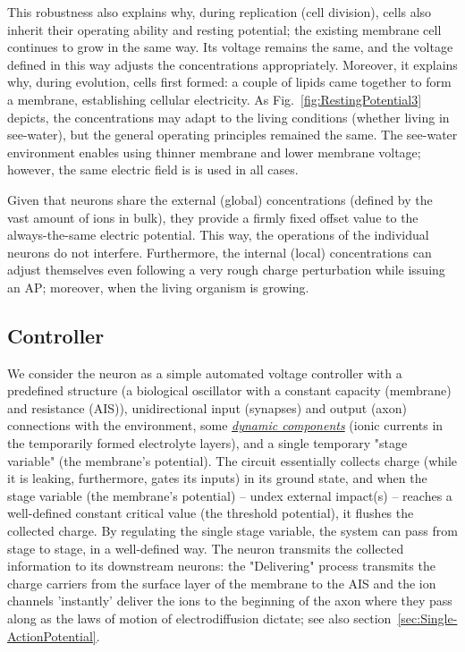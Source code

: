 This robustness also explains why, during replication (cell division), cells also inherit their operating ability and resting potential; the existing membrane cell continues to grow in the same way. Its voltage remains the same, and the voltage defined in this way adjusts the concentrations appropriately. Moreover, it explains why, during evolution, cells first formed: a couple of lipids came together to form a membrane, establishing cellular electricity. As Fig.~\ref{fig:RestingPotential3} depicts, the concentrations may adapt to the living conditions (whether living in see-water), but the general operating principles remained the same. The see-water environment 
enables using thinner membrane and lower membrane voltage; however, the same electric field is is used in all cases.

Given that neurons share the external (global) concentrations (defined by the vast amount of ions in bulk), they provide a firmly fixed offset value to the always-the-same electric potential. This way, the operations of the individual neurons do not interfere. Furthermore, the internal (local) concentrations can adjust themselves even following a very rough charge perturbation
while issuing an \gls{AP};
moreover, when the living organism is growing.

\subsection{Controller\label{sec:Physics-Controller}}
We consider the neuron as a simple automated voltage controller with a predefined structure (a biological oscillator with a constant capacity (membrane) and resistance (AIS)),
unidirectional input (synapses) and output (axon) connections with the environment,
some \hyperlink{DynamicLayer}{\textit{dynamic components}} (ionic currents in the temporarily formed
electrolyte layers), and a single temporary "stage variable" (the membrane's potential).
The circuit essentially collects charge (while it is leaking, furthermore, gates its inputs) in its ground state,
and when the stage variable (the membrane's potential) -- undex external impact(s) -- reaches a well-defined constant critical value (the threshold potential),
it flushes the collected charge.
By regulating the single stage variable, the system can pass
from stage to stage, in a well-defined way.
The neuron transmits the collected information to its downstream neurons:
the "Delivering" process transmits the charge carriers from the surface layer
of the membrane to the 
AIS and the ion channels 'instantly' deliver the ions to the beginning
of the axon where they pass along as the laws of motion of electrodiffusion dictate; see also section~\ref{sec:Single-ActionPotential}.



